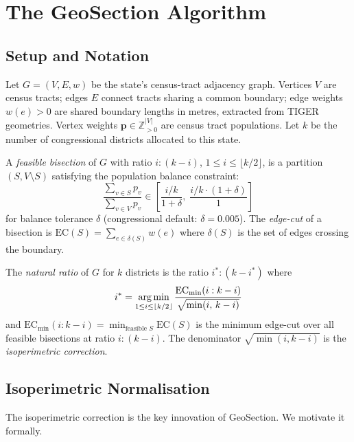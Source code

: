 \section{The GeoSection Algorithm}
\label{sec:algorithm}

\subsection{Setup and Notation}

Let $G = (V, E, w)$ be the state's census-tract adjacency graph.
Vertices $V$ are census tracts; edges $E$ connect tracts sharing a common
boundary; edge weights $w(e) > 0$ are shared boundary lengths in metres,
extracted from TIGER geometries.
Vertex weights $\mathbf{p} \in \mathbb{Z}_{>0}^{|V|}$ are census tract populations.
Let $k$ be the number of congressional districts allocated to this state.

\begin{definition}
A \emph{feasible bisection} of $G$ with ratio $i:(k-i)$, $1 \leq i \leq \lfloor k/2 \rfloor$,
is a partition $(S, V \setminus S)$ satisfying the population balance constraint:
\[
  \frac{\sum_{v \in S} p_v}{\sum_{v \in V} p_v} \in
  \left[\frac{i/k}{1 + \delta},\; \frac{i/k \cdot (1+\delta)}{1}\right]
\]
for balance tolerance $\delta$ (congressional default: $\delta = 0.005$).
The \emph{edge-cut} of a bisection is $\mathrm{EC}(S) = \sum_{e \in \delta(S)} w(e)$
where $\delta(S)$ is the set of edges crossing the boundary.
\end{definition}

\begin{definition}
The \emph{natural ratio} of $G$ for $k$ districts is the ratio $i^*:(k-i^*)$ where
\[
  i^* = \operatorname*{arg\,min}_{1 \leq i \leq \lfloor k/2 \rfloor}
  \frac{\mathrm{EC}_{\min}(i:k-i)}{\sqrt{\min(i,\,k-i)}}
\]
and $\mathrm{EC}_{\min}(i:k-i) = \min_{\text{feasible } S} \mathrm{EC}(S)$
is the minimum edge-cut over all feasible bisections at ratio $i:(k-i)$.
The denominator $\sqrt{\min(i,k-i)}$ is the \emph{isoperimetric correction}.
\end{definition}

\subsection{Isoperimetric Normalisation}
\label{sec:normalisation}

The isoperimetric correction is the key innovation of GeoSection.
We motivate it formally.

